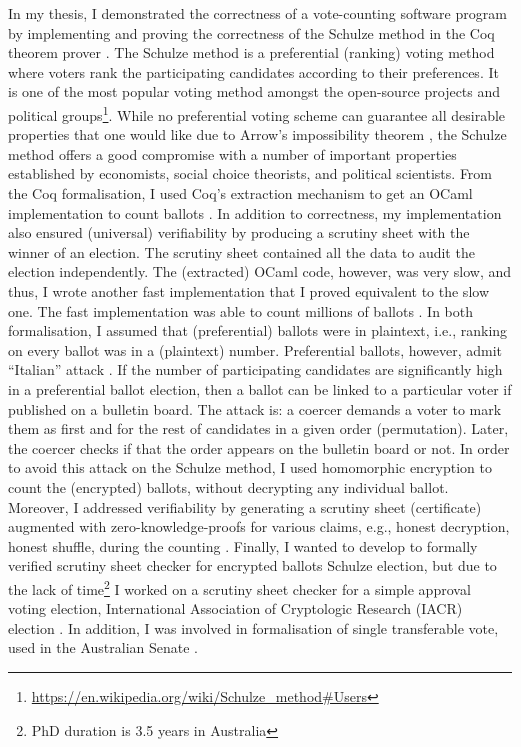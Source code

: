 \documentclass[a4paper]{article}
\begin{document}
In my thesis, I demonstrated the correctness of a vote-counting software program 
by implementing and proving the correctness of the Schulze method in the Coq theorem 
prover \cite{10.1007/978-3-319-66107-0_26}. 
The Schulze method is a preferential (ranking) voting method where voters rank the participating 
candidates according to their preferences. It is one of the most popular voting method amongst the open-source projects and 
political groups\footnote{\url{https://en.wikipedia.org/wiki/Schulze_method#Users}}.
While no preferential voting scheme can guarantee all
desirable properties that one would like due to Arrow's impossibility theorem \cite{arrow1950difficulty}, 
the Schulze method offers a good compromise with a number of important properties established by economists, 
social choice theorists, and political scientists.  From the Coq formalisation, 
I used Coq's extraction mechanism to get an OCaml implementation to count ballots \cite{10.1007/978-3-319-66107-0_26}.
In addition to correctness, my implementation also
ensured (universal) verifiability by producing a scrutiny sheet 
with the winner of an election. The scrutiny sheet contained all the data to audit the election independently. 
The (extracted) OCaml code, however, was 
very slow, and thus, I wrote another fast implementation that I proved equivalent to the slow one.
The fast implementation was able to count millions of ballots \cite{bennett2017no}.
In both formalisation, I assumed that (preferential) ballots were in plaintext, i.e., 
ranking on every ballot was in a (plaintext) number.  Preferential ballots, 
however, admit ``Italian'' attack \cite{Otten, Benaloh:2009:SSC}. 
If the number of participating candidates are significantly high in 
a preferential ballot election,
then a ballot can be linked to a particular voter if published on a bulletin board.
The attack is: a coercer demands a voter to mark them as first and for the rest of candidates
in a given order (permutation). Later, the coercer checks if that the order appears 
on the bulletin board or not. In order to
avoid this attack on the Schulze method, I used homomorphic encryption to count the (encrypted) ballots, without decrypting 
any individual ballot. Moreover, I addressed verifiability by generating a scrutiny sheet (certificate) 
augmented with zero-knowledge-proofs for various claims, e.g., honest decryption, honest shuffle,  
during the counting \cite{10.1007/978-3-030-41600-3_4}. 
Finally, I wanted to develop to formally 
verified scrutiny sheet checker for encrypted ballots Schulze election, but due to the lack of 
time\footnote{PhD duration is 3.5 years in Australia} I worked on a scrutiny sheet checker for a simple approval voting election,
International Association of Cryptologic Research (IACR) election \cite{10.1145/3319535.3354247}.
In addition, I was involved in formalisation of single transferable vote, used in the Australian Senate
\cite{10.1007/978-3-030-00419-4_4}.
\end{document}
